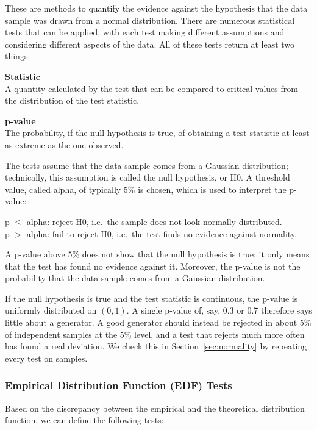 \documentclass[12pt,a4paper]{article}
\newcommand{\head}[1]{\textbf{#1}\\}
\begin{document}
These are methods to quantify the evidence against the hypothesis that the data sample was drawn from a normal distribution. There are numerous statistical tests that can be applied, with each test making different assumptions and considering different aspects of the data. All of these tests return at least two things:

\head{Statistic}
A quantity calculated by the test that can be compared to critical values from the distribution of the test statistic.

\head{p-value}
The probability, if the null hypothesis is true, of obtaining a test statistic at least as extreme as the one observed.

The tests assume that the data sample comes from a Gaussian distribution; technically, this assumption is called the null hypothesis, or H0. A threshold value, called alpha, of typically 5\% is chosen, which is used to interpret the p-value:

p $\le$ alpha: reject H0, i.e.\ the sample does not look normally distributed.\\
p $>$ alpha: fail to reject H0, i.e.\ the test finds no evidence against normality.

A p-value above 5\% does not show that the null hypothesis is true; it only means that the test has found no evidence against it. Moreover, the p-value is not the probability that the data sample comes from a Gaussian distribution.

If the null hypothesis is true and the test statistic is continuous, the p-value is uniformly distributed on $(0,1)$. A single p-value of, say, 0.3 or 0.7 therefore says little about a generator. A good generator should instead be rejected in about 5\% of independent samples at the 5\% level, and a test that rejects much more often has found a real deviation. We check this in Section~\ref{sec:normality} by repeating every test on \Reps{} samples.

\subsubsection{Empirical Distribution Function (EDF) Tests}

Based on the discrepancy between the empirical and the theoretical distribution function, we can define the following tests:
\end{document}
